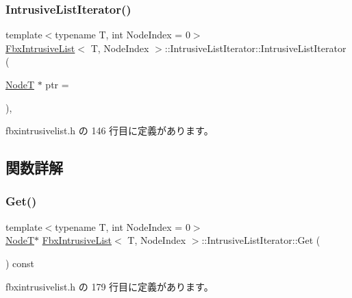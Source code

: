 \subsubsection{\texorpdfstring{Intrusive\+List\+Iterator()}{IntrusiveListIterator()}}
{\footnotesize\ttfamily template$<$typename T, int Node\+Index = 0$>$ \\
\hyperlink{class_fbx_intrusive_list}{Fbx\+Intrusive\+List}$<$ T, Node\+Index $>$\+::Intrusive\+List\+Iterator\+::\+Intrusive\+List\+Iterator (\begin{DoxyParamCaption}\item[{\hyperlink{class_fbx_intrusive_list_a6ffda382a6d029a042cbb0110853680c}{NodeT} $\ast$}]{ptr = {} }\end{DoxyParamCaption})\hspace{0.3cm}{\ttfamily [inline]}, {\ttfamily [explicit]}}



 fbxintrusivelist.\+h の 146 行目に定義があります。



\subsection{関数詳解}
\mbox{\label{class_fbx_intrusive_list_1_1_intrusive_list_iterator_ae4510214381d82038e1b2c37cd3f0c20}} 
\subsubsection{\texorpdfstring{Get()}{Get()}}
{\footnotesize\ttfamily template$<$typename T, int Node\+Index = 0$>$ \\
\hyperlink{class_fbx_intrusive_list_a6ffda382a6d029a042cbb0110853680c}{NodeT}$\ast$ \hyperlink{class_fbx_intrusive_list}{Fbx\+Intrusive\+List}$<$ T, Node\+Index $>$\+::Intrusive\+List\+Iterator\+::\+Get (\begin{DoxyParamCaption}{ }\end{DoxyParamCaption}) const\hspace{0.3cm}{\ttfamily [inline]}}



 fbxintrusivelist.\+h の 179 行目に定義があります。

